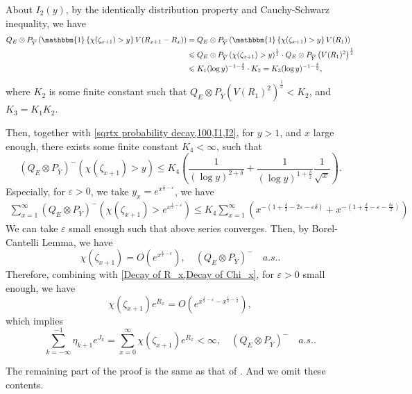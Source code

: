 \documentclass[]{article}
\makeatletter
\numberwithin{equation}{section}
\renewenvironment{proof}[1][\proofname]{%
	\par\pushQED{\qed}\normalfont%
	\topsep6\p@\@plus6\p@\relax
	\trivlist\item[\hskip\labelsep\bfseries#1\@addpunct{.}]%
	\ignorespaces
}{%
	\popQED\endtrivlist\@endpefalse
}
\theoremstyle{thmstyleone}%
\theoremstyle{thmstyletwo}%
\theoremstyle{thmstylethree}%
\theoremstyle{thmstylefour}%
\theoremstyle{thmstylefive}%
\theoremstyle{thmstylesix}%
\newcommand{\ind}[1]{\mathbbm{1}\left\{ #1\right\}}
\makeatother
\begin{document}
\begin{proof}[Proof of \Cref{lemma1 for intermediately}]
		About $I_2(y)$, by the identically distribution property and Cauchy-Schwarz inequality, we have
		\begin{align}
			Q_E\otimes P_{\overline{Y}}
			\left(
			\ind{\chi(\zeta_{x+1}) > y} V(R_{x+1}-R_x)
			\right)
			&=
			Q_E\otimes P_{\overline{Y}}
			\left(
			\ind{\chi(\zeta_{x+1}) > y} V(R_{1})
			\right)
			\nonumber\\
			&\leqslant
			Q_E\otimes P_{\overline{Y}}
			\left(
			\chi(\zeta_{x+1}) > y\right)^{\frac{1}{2}}
			\cdot
			Q_E\otimes P_{\overline{Y}}
			\left( V(R_1) ^{2} \right)^{\frac{1}{2}}
			\nonumber\\
			&\leqslant
			K_1 (\log y)^{-1-\frac{\delta}{2}}
			\cdot K_2 =
			K_3 (\log y)^{-1-\frac{\delta}{2}},\label{I2}
		\end{align}
		where $K_2$ is some finite constant such that $  	Q_E\otimes P_{\overline{Y}}
		\left( V(R_1) ^{2} \right)^{\frac{1}{2}}<K_2 $, and $K_3 = K_1 K_2$.
		
		Then, together with \cref{sqrtx probability decay,100,I1,I2}, for $y>1$, and $x$ large enough, there exists some finite constant $K_4<\infty$, such that
		\begin{equation}
			(Q_E\otimes P_{\overline{Y}})^- (\chi(\zeta_{x+1})>y)
			\leqslant
			K_4\left(\frac{1}{(\log y)^{2+\delta}}
			+\frac{1}{(\log y)^{1+\frac{\delta}{2}}}\frac{1}{\sqrt{x}}\right).
		\end{equation}
		Especially, for $\varepsilon>0$, we take $y_x = e^{x^{\frac{1}{2}-\varepsilon}} $, we have
		\begin{align*}
			\sum_{x=1}^{\infty} 
			(Q_E\otimes P_{\overline{Y}})^- (\chi(\zeta_{x+1})> e^{x^{\frac{1}{2}-\varepsilon}}) 
			\leqslant
			K_4\sum_{x=1}^{\infty} 
			\left(
			x^{-(1+\frac{\delta}{2}-2\varepsilon-\varepsilon\delta)}
			+x^{-(1+\frac{\delta}{4}-\varepsilon-\frac{\delta\varepsilon}{2})}
			\right)
		\end{align*}
		We can take $\varepsilon$ small enough such that above series converges.
		Then, by Borel-Cantelli Lemma, we have
		\begin{equation}\label{Decay of Chi_x}
			\chi(\zeta_{x+1}) = O(e^{x^{\frac{1}{2}-\epsilon}}), \quad  \left(Q_E\otimes P_{\overline{Y}}\right)^-\quad a.s..
		\end{equation}
		Therefore, combining with \cref{Decay of R_x,Decay of Chi_x}, for $\varepsilon>0$ small enough, we have
		\begin{equation}
			\chi(\zeta_{x+1}) e^{R_x} = O\left(  e^{x^{\frac{1}{2}-\varepsilon} - x^{\frac{1}{2}-\frac{\varepsilon}{2}}}  \right),
		\end{equation}
		which implies
		\begin{equation}
			\sum_{k=-\infty}^{-1} \eta_{k+1}e^{J_k}=\sum_{x=0}^{\infty} \chi(\zeta_{x+1}) e^{R_x}<\infty, \quad (Q_E\otimes P_{\overline{Y}})^-\quad a.s..
		\end{equation}
		
		The remaining part of the proof is the same as that of . And we omit these contents. 
	\end{proof}
	
\end{document}
